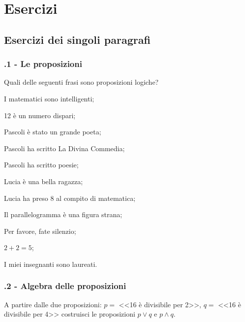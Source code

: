 \section{Esercizi}
\subsection{Esercizi dei singoli paragrafi}
\subsubsection*{\thechapter.1 - Le proposizioni}

\begin{esercizio}
\label{ese:\thechapter.1}
Quali delle seguenti frasi sono proposizioni logiche?
 \begin{enumeratea}
\item I matematici sono intelligenti;
\item 12 è un numero dispari;
\item Pascoli è stato un grande poeta;
\item Pascoli ha scritto La Divina Commedia;
\item Pascoli ha scritto poesie;
\item Lucia è una bella ragazza;
\item Lucia ha preso 8 al compito di matematica;
\item Il parallelogramma è una figura strana;
\item Per favore, fate silenzio;
\item $ 2+2=5 $;
\item I miei insegnanti sono laureati.
 \end{enumeratea}
\end{esercizio}

\subsubsection*{\thechapter.2 - Algebra delle proposizioni}

\begin{esercizio}
\label{ese:\thechapter.2}
A partire dalle due proposizioni: $ p = $ <<16 è divisibile per 2>>, $ q = $ <<16 è divisibile per
4>> costruisci le proposizioni $p\vee q$ e  $p\wedge q$.
\end{esercizio}

